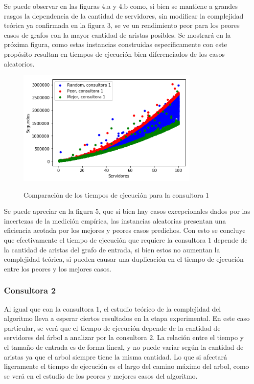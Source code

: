 \documentclass[A4paper,oneside,fleqn,11pt]{article}
\theoremstyle{definition}
\begin{document}
Se puede observar en las figuras 4.a y 4.b como, si bien se mantiene a grandes rasgos la dependencia de la cantidad de servidores, sin modificar la complejidad teórica ya confirmada en la figura 3, se ve un rendimiento peor para los peores casos de grafos con la mayor cantidad de aristas posibles. Se mostrará en la próxima figura, como estas instancias construidas específicamente con este propósito resultan en tiempos de ejecución bien diferenciados de los casos aleatorios.

\begin{figure}[H] %
    \includegraphics[width=0.8\textwidth]{graficosEj2/prm1}
    \label{ni se pa que sirve esto}
    \caption{Comparación de los tiempos de ejecución para la consultora 1}
\end{figure}

Se puede apreciar en la figura 5, que si bien hay casos excepcionales dados por las incertezas de la medición empírica, las instancias aleatorias presentan una eficiencia acotada por los mejores y peores casos predichos. Con esto se concluye que efectivamente el tiempo de ejecución que requiere la consultora 1 depende de la cantidad de aristas del grafo de entrada, si bien estos no aumentan la complejidad teórica, si pueden causar una duplicación en el  tiempo de ejecución entre los peores y los mejores casos.

\subsubsection{Consultora 2}

Al igual que con la consultora 1, el estudio teórico de la complejidad del algoritmo lleva a esperar ciertos resultados en la etapa experimental. En este caso particular, se verá que el tiempo de ejecución depende de la cantidad de servidores del árbol a analizar por la consultora 2. La relación entre el tiempo y el tamaño de entrada es de forma lineal, y no puede variar según la cantidad de aristas ya que el arbol siempre tiene la misma cantidad. Lo que si afectará ligeramente el tiempo de ejecución es el largo del camino máximo del arbol, como se verá en el estudio de los peores y mejores casos del algoritmo.
\end{document}
